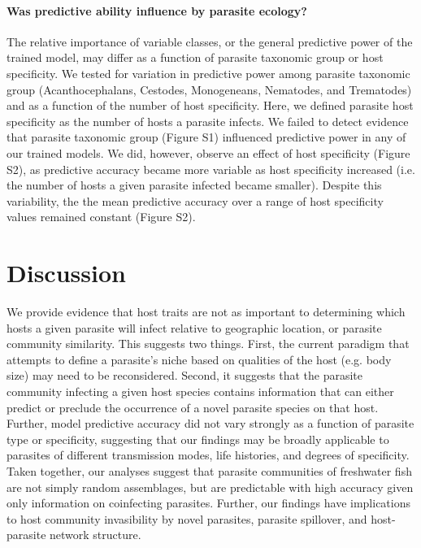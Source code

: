 \documentclass[12pt]{article}
\begin{document}
  
  \paragraph{Was predictive ability influence by parasite ecology?} 
  
  The relative importance of variable classes, or the general predictive power of the trained model, may differ as a function of parasite taxonomic group or host specificity. We tested for variation in predictive power among parasite taxonomic group (Acanthocephalans, Cestodes, Monogeneans, Nematodes, and Trematodes) and as a function of the number of host specificity. Here, we defined parasite host specificity as the number of hosts a parasite infects. We failed to detect evidence that parasite taxonomic group (Figure S1) influenced predictive power in any of our trained models. We did, however, observe an effect of host specificity (Figure S2), as predictive accuracy became more variable as host specificity increased (i.e. the number of hosts a given parasite infected became smaller). Despite this variability, the the mean predictive accuracy over a range of host specificity values remained constant (Figure S2).  
  
  
  
\section*{Discussion}

 We provide evidence that host traits are not as important to determining which hosts a given parasite will infect relative to geographic location, or parasite community similarity. This suggests two things. First, the current paradigm that attempts to define a parasite's niche based on qualities of the host (e.g. body size) may need to be reconsidered. Second, it suggests that the parasite community infecting a given host species contains information that can either predict or preclude the occurrence of a novel parasite species on that host. Further, model predictive accuracy did not vary strongly as a function of parasite type or specificity, suggesting that our findings may be broadly applicable to parasites of different transmission modes, life histories, and degrees of specificity. Taken together, our analyses suggest that parasite communities of freshwater fish are not simply random assemblages, but are predictable with high accuracy given only information on coinfecting parasites. Further, our findings have implications to host community invasibility by novel parasites, parasite spillover, and host-parasite network structure. \\
 
\end{document}
